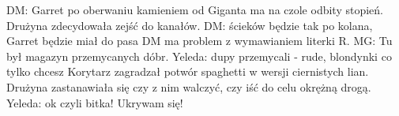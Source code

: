 \documentclass[10pt,twoside,twocolumn]{book}
\begin{document}
%    
%       
DM: Garret po oberwaniu kamieniem od Giganta ma na czole odbity stopień.
%    
%       
Drużyna zdecydowała zejść do kanałów.
DM: ścieków będzie tak po kolana, Garret będzie miał do pasa
%    
%       
DM ma problem z wymawianiem literki R.
MG: Tu był magazyn przemycanych dóbr.
Yeleda: dupy przemycali - rude, blondynki co tylko chcesz
%    
%       
Korytarz zagradzał potwór spaghetti w wersji ciernistych lian. Drużyna zastanawiała się czy z nim walczyć, czy iść do celu okrężną drogą.
Yeleda: ok czyli bitka! Ukrywam się!
%    
\end{document}
